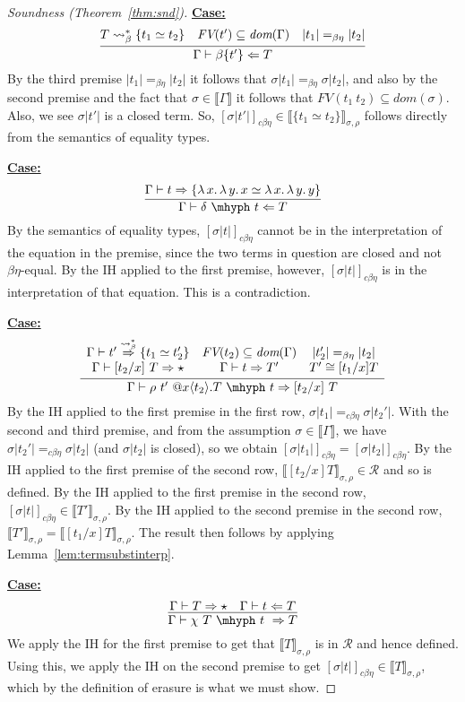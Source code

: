 \documentclass{article}
\newcommand{\absu}[3]{{#1}\, #2.\, #3}
\newcommand{\interp}[1]{\llbracket #1 \rrbracket}
\newcommand{\tpcheck}[0]{\Leftarrow}
\newcommand{\tpsynth}[0]{\Rightarrow}
\newcommand{\tpsynthleads}[0]{\ensuremath{\overset{\leadsto_\beta^*}{\Rightarrow}}}
\newcommand{\cbe}[0]{c\beta\eta}
\newcommand{\startcase}[1]{\vspace{#1} \noindent\textbf{\underline{Case:}}}
\begin{document}
\begin{proof}[Soundness (Theorem~\ref{thm:snd})]
\startcase{.2cm}
\[
  \infer{\Gamma\vdash \beta\{t'\} \tpcheck T}
  {T \leadsto_\beta^* \{t_1 \simeq t_2\} \quad \textit{FV}(t')\subseteq \textit{dom}(\Gamma) \quad |t_1| =_{\beta\eta} |t_2|}
\]
By the third premise \(|t_1| =_{\beta\eta} |t_2|\) it follows that \(\sigma|t_1|
=_{\beta\eta} \sigma|t_2|\), and also by the second premise and the fact that
\(\sigma \in \interp{\Gamma}\) it follows that
\(\textit{FV}(t_1\ t_2) \subseteq \textit{dom}(\sigma)\).
Also, we see \(\sigma|t'|\) is a closed term.
So, $[\sigma|t'|]_{\cbe}\in\interp{\{ t_1 \simeq t_2 \}}_{\sigma,\rho}$ follows
directly from the semantics of equality types.

\startcase{.2cm}
\[
    \infer{\Gamma\vdash \delta\ \mhyph\ t \tpcheck T}{\Gamma\vdash t\tpsynth \{ \absu{\lambda}{x}{\absu{\lambda}{y}{x}} \simeq \absu{\lambda}{x}{\absu{\lambda}{y}{y}}\}}  
\]
By the semantics of equality types, $[\sigma|t|]_{\cbe}$ cannot be in the interpretation of the equation in the premise,
since the two terms in question are closed and not $\beta\eta$-equal.  By the IH applied to the first premise, however,
$[\sigma|t|]_{\cbe}$ is in the interpretation of that equation.  This is a contradiction.

\startcase{.2cm}
\[
  \infer{\Gamma \vdash \rho\ t'\ @x\langle t_2 \rangle.T\ \mhyph\ t \tpsynth [t_2/x]\ T}
  {
    \begin{array}{ccc}
      \Gamma \vdash t' \tpsynthleads \{t_1 \simeq t_2'\}
      & \textit{FV}(t_2) \subseteq \textit{dom}(\Gamma)
      & |t_2'| =_{\beta\eta} |t_2|
      \\ \Gamma \vdash [t_2/x]\ T \tpsynth \star
      & \Gamma \vdash t \tpsynth T'
      & T' \cong [t_1/x]T
    \end{array}
  }
\]
By the IH applied to the first premise in the first row, $\sigma|t_1| =_{\cbe}
\sigma|t_2'|$.
With the second and third premise, and from the assumption \(\sigma \in
\interp{\Gamma}\), we have \(\sigma|t_2'| =_{\cbe} \sigma|t_2|\) (and
\(\sigma|t_2|\) is closed), so we obtain
\([\sigma|t_1|]_{\cbe} = [\sigma|t_2|]_{\cbe}\).
By the IH applied to the first premise of the second row,
\(\interp{[t_2/x]T}_{\sigma,\rho} \in \mathcal{R}\) and so is defined.
By the IH applied to the first premise in the second row,
\([\sigma|t|]_{c\beta\eta} \in \interp{T'}_{\sigma,\rho}\).
By the IH applied to the second premise in the second row,
\(\interp{T'}_{\sigma,\rho} = \interp{[t_1/x]T}_{\sigma,\rho}\).
The result then follows by applying Lemma~\ref{lem:termsubstinterp}.

\startcase{.2cm}
\[
  \infer{\Gamma \vdash \chi\ T\ \mhyph\ t\ \tpsynth T}
  {\Gamma \vdash T \tpsynth \star & \Gamma \vdash t \tpcheck T}
\]
We apply the IH for the first premise to get that
$\interp{T}_{\sigma,\rho}$ is in $\mathcal{R}$ and hence defined.
Using this, we apply the IH on the second premise to get \([\sigma|t|]_{\cbe}
\in \interp{T}_{\sigma,\rho}\), which by the definition of erasure is what we
must show.


\end{proof}
\end{document}
